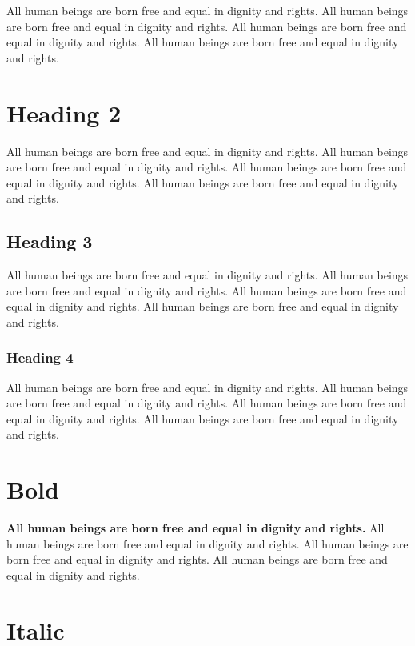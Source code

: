 \documentclass[
  titlepage,
  openright,
  DIV=calc,
  toc=listof,
  listof=nochaptergap]{scrbook}
\begin{document}
All human beings are born free and equal in dignity and rights. All
human beings are born free and equal in dignity and rights. All human
beings are born free and equal in dignity and rights. All human beings
are born free and equal in dignity and rights.

\hypertarget{heading-2}{%
\section{Heading 2}\label{heading-2}}

All human beings are born free and equal in dignity and rights. All
human beings are born free and equal in dignity and rights. All human
beings are born free and equal in dignity and rights. All human beings
are born free and equal in dignity and rights.

\hypertarget{heading-3}{%
\subsection{Heading 3}\label{heading-3}}

All human beings are born free and equal in dignity and rights. All
human beings are born free and equal in dignity and rights. All human
beings are born free and equal in dignity and rights. All human beings
are born free and equal in dignity and rights.

\hypertarget{heading-4}{%
\subsubsection{Heading 4}\label{heading-4}}

All human beings are born free and equal in dignity and rights. All
human beings are born free and equal in dignity and rights. All human
beings are born free and equal in dignity and rights. All human beings
are born free and equal in dignity and rights.

\hypertarget{bold}{%
\section{Bold}\label{bold}}

\textbf{All human beings are born free and equal in dignity and rights.}
All human beings are born free and equal in dignity and rights. All
human beings are born free and equal in dignity and rights. All human
beings are born free and equal in dignity and rights.

\hypertarget{italic}{%
\section{Italic}\label{italic}}
\end{document}
